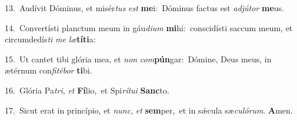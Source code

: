{\numbfont\textcolor{\numbcolor}{13.}}~Audívit Dóminus, et misér\textit{tus} \textit{est} \textbf{me}\-i:~\star Dóminus factus est \textit{ad}\-\textit{jú}\textit{tor} \textbf{me}\-us.\par
{\numbfont\textcolor{\numbcolor}{14.}}~Convertísti planctum meum in gáu\-\textit{di}\-\textit{um} \textbf{mi}\-hi:~\star conscidísti saccum meum, et circumdedís\textit{ti} \textit{me} \textit{læ}\-\textbf{tí}\textbf{ti}a:\par
{\numbfont\textcolor{\numbcolor}{15.}}~Ut cantet tibi glória mea, et \textit{non} \textit{com}\-\textbf{pún}gar:~\star Dómine, Deus meus, in ætérnum con\-\textit{fi}\-\textit{té}\textit{bor} \textbf{ti}\-bi.\par
{\numbfont\textcolor{\numbcolor}{16.}}~Glória Pa\-\textit{tri}\-, \textit{et} \textbf{Fí}\-lio,~\star et Spi\-\textit{rí}\-\textit{tu}\textit{i} \textbf{Sanc}\-to.\par
{\numbfont\textcolor{\numbcolor}{17.}}~Sicut erat in princípio, et \textit{nunc}\-, \textit{et} \textbf{sem}\-per,~\star et in sǽcula sæ\-\textit{cu}\-\textit{ló}\textit{rum}. \textbf{A}\-men.\par
